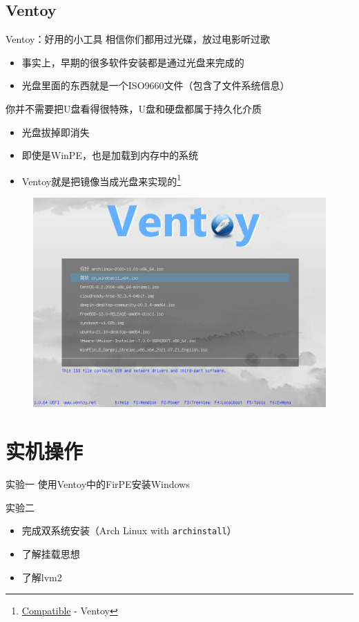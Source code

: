 \documentclass[aspectratio=1610]{beamer}
\begin{document}
\subsection{Ventoy}

\begin{frame}{Ventoy：好用的小工具}
    相信你们都用过光碟，放过电影听过歌
    \begin{center}
        \begin{itemize}
            \item 事实上，早期的很多软件安装都是通过光盘来完成的
            \item 光盘里面的东西就是一个ISO9660文件（包含了文件系统信息）
        \end{itemize}
    \end{center}

    你并不需要把U盘看得很特殊，U盘和硬盘都属于\alert{持久化介质}
    \begin{center}
        \begin{itemize}
            \item 光盘拔掉即消失
            \item 即使是WinPE，也是加载到内存中的系统
            \item Ventoy就是把镜像当成光盘来实现的\footnote{\href{https://www.ventoy.net/cn/compatible.html}{Compatible} - Ventoy}
        \end{itemize}
    \end{center}
    \begin{figure}
        \centering
        \includegraphics[width=0.29\linewidth]{pic/screen_uefi.png}
    \end{figure}
\end{frame}

\section{实机操作}

\begin{frame}{实验一}
    使用Ventoy中的FirPE安装Windows
\end{frame}

\begin{frame}{实验二}
    \begin{center}
        \begin{itemize}
            \item 完成双系统安装（Arch Linux with \texttt{archinstall}）
            \item 了解挂载思想
            \item 了解lvm2
        \end{itemize}
    \end{center}
\end{frame}
\end{document}

